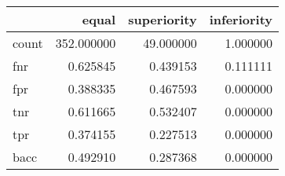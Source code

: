 \begin{tabular}{lrrr}
\toprule
{} &       equal &  superiority &  inferiority \\
\midrule
count &  352.000000 &    49.000000 &     1.000000 \\
fnr   &    0.625845 &     0.439153 &     0.111111 \\
fpr   &    0.388335 &     0.467593 &     0.000000 \\
tnr   &    0.611665 &     0.532407 &     0.000000 \\
tpr   &    0.374155 &     0.227513 &     0.000000 \\
bacc  &    0.492910 &     0.287368 &     0.000000 \\
\bottomrule
\end{tabular}
